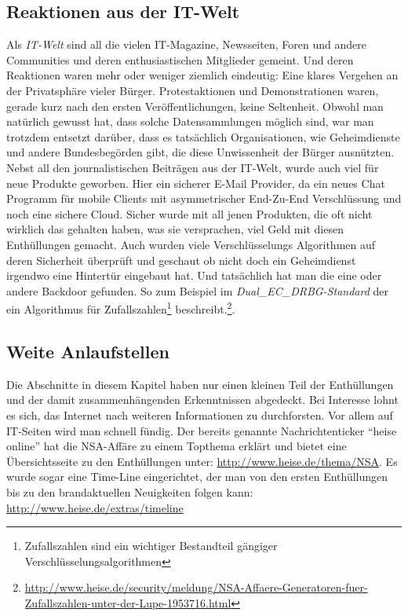 \subsection{Reaktionen aus der IT-Welt}
Als \textit{IT-Welt} sind all die vielen IT-Magazine, Newsseiten, Foren und andere Communities und deren enthusiastischen Mitglieder gemeint. Und deren Reaktionen waren mehr oder weniger ziemlich eindeutig: Eine klares Vergehen an der Privatsphäre vieler Bürger. Protestaktionen und Demonstrationen waren, gerade kurz nach den ersten Veröffentlichungen, keine Seltenheit. Obwohl man natürlich gewusst hat, dass solche Datensammlungen möglich sind, war man trotzdem entsetzt darüber, dass es tatsächlich Organisationen, wie Geheimdienste und andere Bundesbegörden gibt, die diese Unwissenheit der Bürger ausnützten. Nebst all den journalistischen Beiträgen aus der IT-Welt, wurde auch viel für neue Produkte geworben. Hier ein sicherer E-Mail Provider, da ein neues Chat Programm für mobile Clients mit asymmetrischer End-Zu-End Verschlüssung und noch eine sichere Cloud. Sicher wurde mit all jenen Produkten, die oft nicht wirklich das gehalten haben, was sie versprachen, viel Geld mit diesen Enthüllungen gemacht.
Auch wurden viele Verschlüsselungs Algorithmen auf deren Sicherheit überprüft und geschaut ob nicht doch ein Geheimdienst irgendwo eine Hintertür eingebaut hat. Und tatsächlich hat man die eine oder andere Backdoor gefunden. So zum Beispiel im \textit{Dual\_EC\_DRBG-Standard} der ein Algorithmus für Zufallszahlen\footnote{Zufallszahlen sind ein wichtiger Bestandteil gängiger Verschlüsselungsalgorithmen} beschreibt.\footnote{\url{http://www.heise.de/security/meldung/NSA-Affaere-Generatoren-fuer-Zufallszahlen-unter-der-Lupe-1953716.html}}.

\subsection{Weite Anlaufstellen}
Die Abschnitte in diesem Kapitel haben nur einen kleinen Teil der Enthüllungen und der damit zusammenhängenden Erkenntnissen abgedeckt. Bei Interesse lohnt es sich, das Internet nach weiteren Informationen zu durchforsten. Vor allem auf IT-Seiten wird man schnell fündig. Der bereits genannte Nachrichtenticker ``heise online'' hat die NSA-Affäre zu einem Topthema erklärt und bietet eine Übersichtsseite zu den Enthüllungen unter: \url{http://www.heise.de/thema/NSA}. Es wurde sogar eine Time-Line eingerichtet, der man von den ersten Enthüllungen bis zu den brandaktuellen Neuigkeiten folgen kann: \url{http://www.heise.de/extras/timeline}
